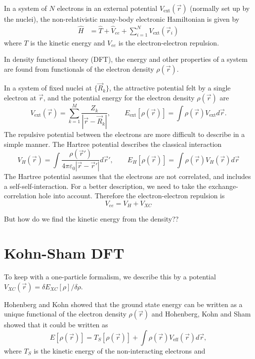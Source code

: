 \documentclass[11pt,bibliography=totoc,index=totoc]{scrbook}   %
\begin{document}
In a system of $N$ electrons in an external potential $V_{\text{ext}}(\vec{r})$ 
(normally set up by the nuclei), the non-relativistic many-body electronic 
Hamiltonian is given by 
\begin{align}
  \hat{H} &= \hat{T} + \hat{V}_{ee} + \sum_{i=1}^N V_{\text{ext}}(\vec{r}_i)
  \label{eq:hamiltonian}
\end{align}
where $T$ is the kinetic energy and $V_{ee}$ is the electron-electron repulsion.

In density functional theory (DFT), the energy and other properties of a 
system are found from functionals of the electron density $\rho(\vec{r})$.

In a system of fixed nuclei at $\{\vec{R}_k\}$, the attractive potential 
felt by a single electron at $\vec{r}$, and the potential energy for the 
electron density $\rho(\vec{r})$ are
\begin{equation}
  V_{\text{ext}}(\vec{r}) = \sum_{k=1}^M \frac{Z_k}{
  |\vec{r}-\vec{R}_k|}
  ,\qquad
  E_{\text{ext}}[\rho(\vec{r})] = \int\rho(\vec{r})V_{\text{ext}}d\vec{r}.
  \label{eq:nuclei-pot}
\end{equation}
The repulsive potential between the electrons are more difficult to describe in
a simple manner. The Hartree potential describes the classical interaction
\begin{equation}
  V_H(\vec{r}) = \int\frac{\rho(\vec{r}')}{4\pi\varepsilon_0|\vec{r}-\vec{r}'|}
  d\vec{r}',\qquad
  E_{H}[\rho(\vec{r})] = \int \rho(\vec{r}) V_H(\vec{r}) d\vec{r}
  \label{eq:hartree-pot}
\end{equation}
The Hartree potential assumes that the electrons are not correlated, and
includes a self-self-interaction. For a better description, we need to take
the exchange-correlation hole into account\cite{Sutton:1993}. Therefore the
electron-electron repulsion is
\begin{equation}
  V_{ee} = V_H + V_{XC}
\end{equation}

But how do we find the kinetic energy from the density??

\section{Kohn-Sham DFT}

To keep with a
one-particle formalism, we describe this by a potential $V_{XC}(\vec{r}) = 
\delta E_{XC}[\rho]/\delta \rho$.

Hohenberg and Kohn showed that the ground state energy can be written as a
unique functional of the electron density
$\rho(\vec{r})$\cite{HohenbergKohn:1964} and Hohenberg, Kohn and Sham 
showed\cite{HohenbergKohn:1964,KohnSham:1965} that it could be written as 
\begin{equation}
  E[\rho(\vec{r})] = T_S[\rho(\vec{r})] + 
  \int \rho(\vec{r})
  V_{\text{eff}}(\vec{r})d\vec{r},
  \label{eq:kohnshamfunc}
\end{equation}
where $T_S$ is the kinetic energy of the non-interacting electrons and
\end{document}
